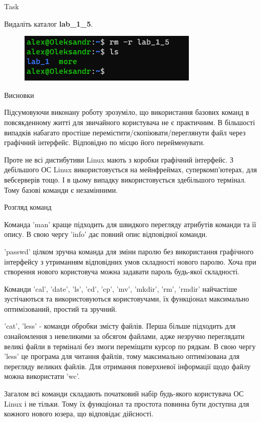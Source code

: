 \documentclass[a4paper,12pt]{article}
\newcommand{\RomanNumeralCaps}[1]{\MakeUppercase{\romannumeral #1}}
\begin{document}
\newpage
    \begin{center}
        \Large{Task \RomanNumeralCaps{18}}
    \end{center}
    Видаліть каталог \textbf{lab\_1\_5}.
    \begin{figure}[h!]
        \begin{minipage}[h]{1\linewidth}
            \centering
            \includegraphics[width=0.6\linewidth]{Prt sc/Figure_19.png}  
        \end{minipage}
    \end{figure}

    \begin{center}
        \Large{Висновки}
    \end{center}

    Підсумовуючи виконану роботу зрозуміло, що використання базових команд в 
    повсякденному житті для звичайного користувача не є практичним. В більшості випадків 
    набагато простіше перемістити/скопіювати/переглянути файл через графічний інтерфейс. 
    Відповідно по місцю його перейменувати.

    Проте не всі дистибутиви Linux мають з коробки графічний інтерфейс. 
    З дебільшого ОС Linux використовується на мейнфреймах, суперкомп'ютерах,
    для вебсерверів тощо. І в цьому випадку використовується здебільшого термінал. 
    Тому базові команди є незамінними.
    \begin{center}
        Розгляд команд
    \end{center}

    Команда 'man' краще підходить для швидкого перегляду атрибутів команди та її опису. 
    В свою чергу 'info' дає повний опис відповідної команди.
    
    'passwd' цілком зручна команда для зміни паролю без використання графічного інтерфейсу
    з утриманням відповідних умов складності нового паролю. Хоча при створення нового 
    користовуча можна задавати пароль будь-якої складності.
    
    Команди 'cal', 'date', 'ls', 'cd', 'cp', 'mv', 'mkdir', 'rm', 'rmdir' найчастіше
    зустічаються та використовуються користовучами, їх функціонал максимально оптимізований,
    простий та зручний.
    
    'cat', 'less' - команди обробки змісту файлів. Перша більше підходить для ознайомлення з 
    невеликими за обсягом файлами, адже незручно переглядати великі файли в терміналі без
    змоги переміщати курсор по рядкам. В свою чергу 'less' це програма для читання файлів,
    тому максимально оптимізована для перегляду великих файлів. Для отримання поверхневої
    інформації щодо файлу можна використати 'wc'.
    
    Загалом всі команди складають початковий набір будь-якого користувача ОС Linux і не тільки. 
    Тому їх функціонал та простота повинна бути доступна для кожного нового юзера, що відповідає дійсності.
\end{document}
